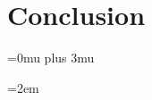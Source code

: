 \documentclass[10pt,twocolumn]{article}
\begin{document}
\section{Conclusion}


\appendix



% 
% 
% 
% 

\nocite{*}

\makeatletter
\def\url@leostyle{\@ifundefined{selectfont}{\def\UrlFont{\sf}}{\def\UrlFont{\small\ttfamily}}}
\makeatother
{}

\Urlmuskip=0mu plus 3mu

\sloppy
\emergencystretch=2em



\end{document}
